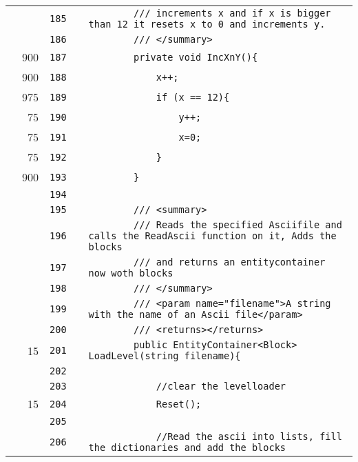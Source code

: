 \documentclass[a4paper,landscape,10pt]{article}
\begin{document}
\begin{longtable}[l]{lrrll}
\cellcolor{gray} &  & \verb~185~ & & \verb~        /// increments x and if x is bigger than 12 it resets x to 0 and increments y.~\\
\cellcolor{gray} &  & \verb~186~ & & \verb~        /// </summary>~\\
\cellcolor{green} & 900 & \verb~187~ & & \verb~        private void IncXnY(){~\\
\cellcolor{green} & 900 & \verb~188~ & & \verb~            x++;~\\
\cellcolor{green} & 975 & \verb~189~ & & \verb~            if (x == 12){~\\
\cellcolor{green} & 75 & \verb~190~ & & \verb~                y++;~\\
\cellcolor{green} & 75 & \verb~191~ & & \verb~                x=0;~\\
\cellcolor{green} & 75 & \verb~192~ & & \verb~            }~\\
\cellcolor{green} & 900 & \verb~193~ & & \verb~        }~\\
\cellcolor{gray} &  & \verb~194~ & & \verb~~\\
\cellcolor{gray} &  & \verb~195~ & & \verb~        /// <summary>~\\
\cellcolor{gray} &  & \verb~196~ & & \verb~        /// Reads the specified Asciifile and calls the ReadAscii function on it, Adds the blocks~\\
\cellcolor{gray} &  & \verb~197~ & & \verb~        /// and returns an entitycontainer now woth blocks~\\
\cellcolor{gray} &  & \verb~198~ & & \verb~        /// </summary>~\\
\cellcolor{gray} &  & \verb~199~ & & \verb~        /// <param name="filename">A string with the name of an Ascii file</param>~\\
\cellcolor{gray} &  & \verb~200~ & & \verb~        /// <returns></returns>~\\
\cellcolor{green} & 15 & \verb~201~ & & \verb~        public EntityContainer<Block> LoadLevel(string filename){~\\
\cellcolor{gray} &  & \verb~202~ & & \verb~~\\
\cellcolor{gray} &  & \verb~203~ & & \verb~            //clear the levelloader~\\
\cellcolor{green} & 15 & \verb~204~ & & \verb~            Reset();~\\
\cellcolor{gray} &  & \verb~205~ & & \verb~~\\
\cellcolor{gray} &  & \verb~206~ & & \verb~            //Read the ascii into lists, fill the dictionaries and add the blocks~\\

\end{longtable}
\end{document}
